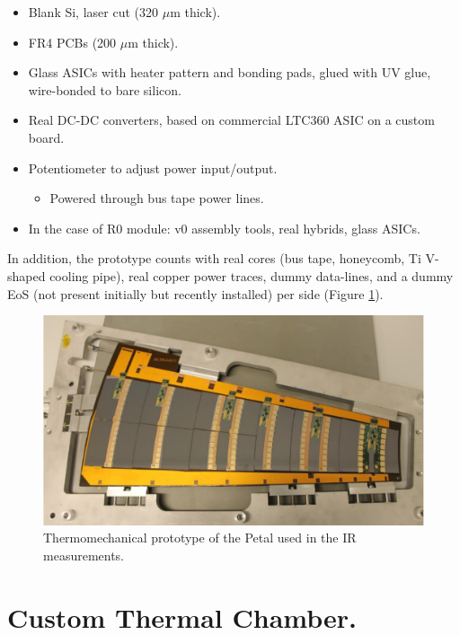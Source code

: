 		\begin{itemize}
			\renewcommand{\labelitemi}{$\diamond$}
			\item Blank Si, laser cut (320 $\mu$m thick).
			\item FR4 PCBs (200 $\mu$m thick).
			\item Glass ASICs with heater pattern and bonding pads, glued with UV glue, wire-bonded to bare silicon.
			\item Real DC-DC converters, based on commercial LTC360 ASIC on a custom board.
			\item Potentiometer to adjust power input/output.
			\begin{itemize}
			\renewcommand{\labelitemi}{$\bullet$}
				\item Powered through bus tape power lines.
			\end{itemize}
			\item In the case of R0 module: v0 assembly tools, real hybrids, glass ASICs.
		\end{itemize}
		
		In addition, the prototype counts with real cores (bus tape, honeycomb, Ti V-shaped cooling pipe), real copper power traces, dummy data-lines, and a dummy EoS (not present initially but recently installed) per side (Figure \ref{fig2.2}).
		
		\begin{figure}[ht!]
			\centering
			\captionsetup{justification=centering,margin=2cm}
			\includegraphics[scale=0.35]{Figures/Chapter02/PetalConstruction.pdf}
			\caption{Thermomechanical prototype of the Petal  used in the IR measurements.}\label{fig2.2}
		\end{figure}\bigskip
		
	\section{Custom Thermal Chamber. }\label{section2.2}
	
